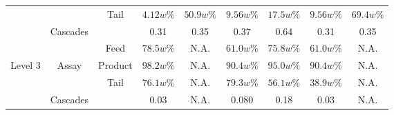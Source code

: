 \begin{table}[htb]
\begin{tabular}{ccccccccc}
        &            & Tail      & $4.12w\%$ & $50.9w\%$ & $9.56w\%$ & $17.5w\%$ & $9.56w\%$ & $69.4w\%$ \\
        & Cascades   &           & 0.31      & 0.35      & 0.37      & 0.64      & 0.31      & 0.35      \\
\midrule                                                                                                 
        &            & Feed      & $78.5w\%$ & N.A.      & $61.0w\%$ & $75.8w\%$ & $61.0w\%$ & N.A.      \\
Level 3 & Assay      & Product   & $98.2w\%$ & N.A.      & $90.4w\%$ & $95.0w\%$ & $90.4w\%$ & N.A.      \\
        &            & Tail      & $76.1w\%$ & N.A.      & $79.3w\%$ & $56.1w\%$ & $38.9w\%$ & N.A.      \\
        & Cascades   &           & 0.03      & N.A.      & 0.080     & 0.18      & 0.03      & N.A.      \\
\bottomrule
\end{tabular}
  \label{tab:cascade_config}
\end{table}

